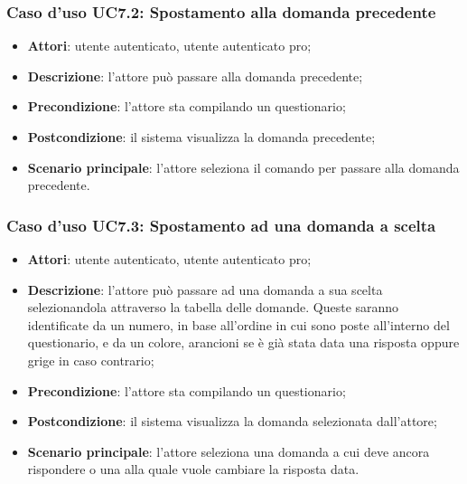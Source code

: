 \subsubsection{Caso d'uso UC7.2: Spostamento alla domanda precedente}
\label{UC7.2}
\begin{itemize}
\item\textbf{Attori}: utente autenticato, utente autenticato pro;
\item\textbf{Descrizione}: l'attore può passare alla domanda precedente;
\item\textbf{Precondizione}: l'attore sta compilando un questionario;
\item\textbf{Postcondizione}: il sistema visualizza la domanda precedente;
\item\textbf{Scenario principale}: l'attore seleziona il comando per passare alla domanda precedente.
\end{itemize}

\subsubsection{Caso d'uso UC7.3: Spostamento ad una domanda a scelta}
\label{UC7.3}
\begin{itemize}
\item\textbf{Attori}: utente autenticato, utente autenticato pro;
\item\textbf{Descrizione}: l'attore può passare ad una domanda a sua scelta selezionandola attraverso la tabella delle domande. Queste saranno identificate da un numero, in base all'ordine in cui sono poste all'interno del questionario, e da un colore, arancioni se è già stata data una risposta oppure grige in caso contrario;
\item\textbf{Precondizione}: l'attore sta compilando un questionario;
\item\textbf{Postcondizione}: il sistema visualizza la domanda selezionata dall'attore;
\item\textbf{Scenario principale}: l'attore seleziona una domanda a cui deve ancora rispondere o una alla quale vuole cambiare la risposta data.
\end{itemize}

